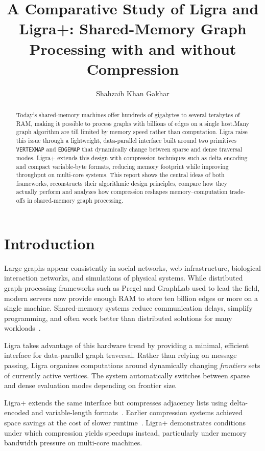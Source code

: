 \documentclass[a4paper,USenglish]{lipics-v2021}
\title{A Comparative Study of Ligra and Ligra+: Shared-Memory Graph Processing with and without Compression}
\author{Shahzaib Khan Gakhar}{RPTU Kaiserslautern}{Shahzaib.gakhar@edu.rptu.de}{}{}
\begin{document}
\maketitle

\begin{abstract}
Today's shared-memory machines offer hundreds of gigabytes to several terabytes of RAM, making it possible to process graphs with billions of edges on a single host.Many graph algorithm are till limited by memory speed rather than computation. Ligra raise this issue through a lightweight, data-parallel interface built around two primitives {\tt VERTEXMAP} and {\tt EDGEMAP} that dynamically change between sparse and dense traversal modes. Ligra+ extends this design with compression techniques such as delta encoding and compact variable-byte formats, reducing memory footprint while improving throughput on multi-core systems. This report shows the central ideas of both frameworks, reconstructs their algorithmic design principles, compare how they actually perform and analyzes how compression reshapes memory–computation trade-offs in shared-memory graph processing.
\end{abstract}

\section{Introduction}
Large graphs appear consistently in social networks, web infrastructure, biological interaction networks, and simulations of physical systems. While distributed graph-processing frameworks such as Pregel and GraphLab used to lead the field, modern servers now provide enough RAM to store ten billion edges or more on a single machine. Shared-memory systems reduce communication delays, simplify programming, and often work better than distributed solutions for many workloads~\cite{shun2013ligra}.

Ligra takes advantage of this hardware trend by providing a minimal, efficient interface for data-parallel graph traversal. Rather than relying on message passing, Ligra organizes computations around dynamically changing \emph{frontiers} sets of currently active vertices. The system automatically switches between sparse and dense evaluation modes depending on frontier size.

Ligra+ extends the same interface but compresses adjacency lists using delta-encoded and variable-length formats~\cite{shun2015ligra+}. Earlier compression systems achieved space savings at the cost of slower runtime~\cite{blandford2003compact}. Ligra+ demonstrates conditions under which compression yields speedups instead, particularly under memory bandwidth pressure on multi-core machines.
\end{document}
